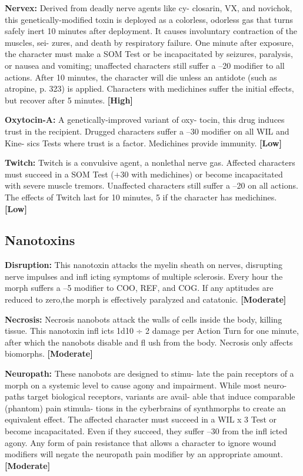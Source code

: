\textbf{Nervex:} Derived from deadly nerve agents like cy-
closarin, VX, and novichok, this genetically-modified 
toxin is deployed as a colorless, odorless gas that 
turns safely inert 10 minutes after deployment. It 
causes involuntary contraction of the muscles, sei-
zures, and death by respiratory failure. One minute 
after exposure, the character must make a SOM Test 
or be incapacitated by seizures, paralysis, or nausea 
and vomiting; unaffected characters still suffer a –20 
modifier to all actions. After 10 minutes, the character 
will die unless an antidote (such as atropine, p. 323) is 
applied. Characters with medichines suffer the initial 
effects, but recover after 5 minutes. \textbf{[High]}

\textbf{Oxytocin-A:} A genetically-improved variant of oxy-
tocin, this drug induces trust in the recipient. Drugged 
characters suffer a –30 modifier on all WIL and Kine-
sics Tests where trust is a factor. Medichines provide 
immunity. \textbf{[Low]}

\textbf{Twitch:} Twitch is a convulsive agent, a nonlethal 
nerve gas. Affected characters must succeed in a SOM 
Test (+30 with medichines) or become incapacitated 
with severe muscle tremors. Unaffected characters still 
suffer a –20 on all actions. The effects of Twitch last for 
10 minutes, 5 if the character has medichines. \textbf{[Low]}

\subsection{Nanotoxins}

\textbf{Disruption:} This nanotoxin attacks the myelin sheath 
on nerves, disrupting nerve impulses and infl icting 
symptoms of multiple sclerosis. Every hour the morph 
suffers a –5 modifier to COO, REF, and COG. If any 
aptitudes are reduced to zero,the morph is effectively 
paralyzed and catatonic. \textbf{[Moderate]}

\textbf{Necrosis:} Necrosis nanobots attack the walls of cells 
inside the body, killing tissue. This nanotoxin infl icts 
1d10 ÷ 2 damage per Action Turn for one minute, after 
which the nanobots disable and fl ush from the body. 
Necrosis only affects biomorphs. \textbf{[Moderate]}

\textbf{Neuropath:} These nanobots are designed to stimu-
late the pain receptors of a morph on a systemic level 
to cause agony and impairment. While most neuro-
paths target biological receptors, variants are avail-
able that induce comparable (phantom) pain stimula-
tions in the cyberbrains of synthmorphs to create an 
equivalent effect. The affected character must succeed 
in a WIL x 3 Test or become incapacitated. Even if 
they succeed, they suffer –30 from the infl icted agony. 
Any form of pain resistance that allows a character 
to ignore wound modifiers will negate the neuropath 
pain modifier by an appropriate amount. \textbf{[Moderate]}

